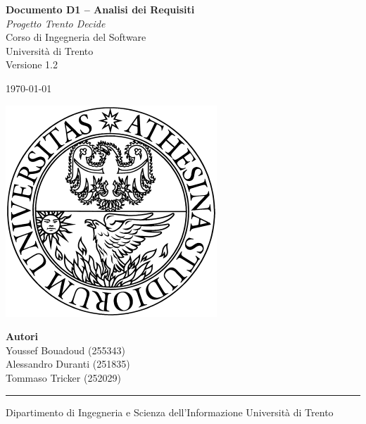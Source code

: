 \documentclass[a4paper]{report}
\begin{document}
\begin{titlepage}
  \centering

  {\Huge \bfseries Documento D1 – Analisi dei Requisiti }\\[1.5em]
  \Large \textit{Progetto Trento Decide}\\[1em]
  \Large {Corso di Ingegneria del Software \\
Università di Trento}\\[1em]

  {\large Versione 1.2 }
  \vspace{0.5cm}

  {\large \today \par}
  \vspace{3.5cm}

  \includegraphics[width=0.33 \textwidth]{img/unitn.png}

\vfill

\begin{flushright}
  \textbf{Autori}\\[0.4em]
  Youssef Bouadoud (255343)\\
  Alessandro Duranti (251835)\\
  Tommaso Tricker (252029)
\end{flushright}

\vspace{1cm}

\hrule
\vspace{0.3em}
{\small
Dipartimento di Ingegneria e Scienza dell'Informazione
Università di Trento
}

\end{titlepage}

\tableofcontents
\newpage





\end{document}
